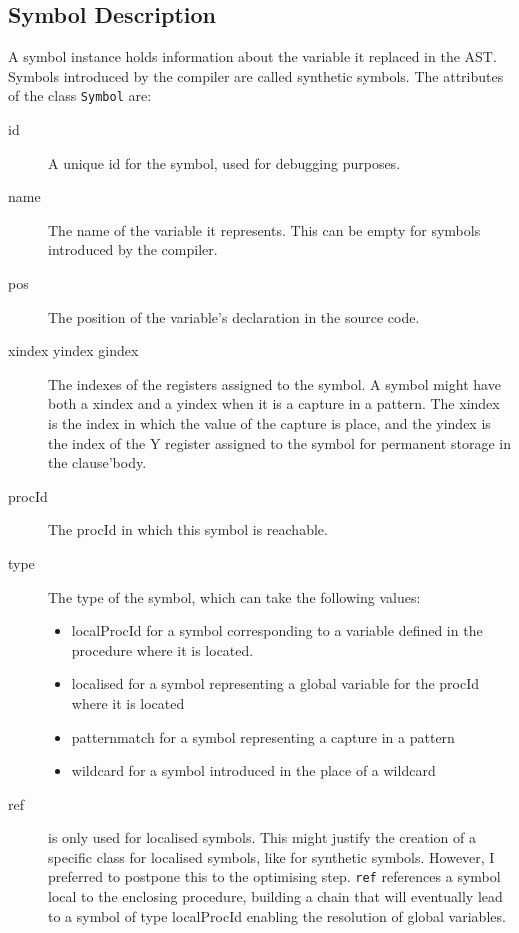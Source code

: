 \documentclass[a4paper]{memoir}
\begin{document}
\begin{appendices}
\chapter{Symbol Description}\label{appendix:symbol}
A symbol instance holds information about the variable it replaced in the AST. Symbols introduced by the compiler are called synthetic symbols.
The attributes of the class \lstinline!Symbol! are:
\begin{description}
  \item[id] A unique id for the symbol, used for debugging purposes.
  \item[name] The name of the variable it represents. This can be empty for symbols introduced by the compiler.
  \item[pos] The position of the variable's declaration in the source code.
  \item[xindex yindex gindex] The indexes of the registers assigned to the symbol. A symbol might have both a xindex and a yindex when it is a capture in a pattern. The xindex is the index in which the value of the capture is place, and the yindex is the index of the Y register assigned to the symbol for permanent storage in the clause'body.
  \item[procId] The procId in which this symbol is reachable.
  \item[type] The type of the symbol, which can take the following values:
    \begin{itemize}
      \item localProcId for a symbol corresponding to a variable defined in the procedure where it is located.
      \item localised for a symbol representing a global variable for the procId where it is located
      \item patternmatch for a symbol representing a capture in a pattern
      \item wildcard for a symbol introduced in the place of a wildcard
    \end{itemize}
  \item[ref] is only used for localised symbols. This might justify the creation
    of a specific class for localised symbols, like for synthetic symbols.
    However, I preferred to postpone this to the optimising step. \lstinline!ref! references a symbol local to the enclosing procedure, building a chain that will eventually lead to a symbol of type localProcId enabling the resolution of global variables. %
\end{description}


\end{appendices}
\end{document}
